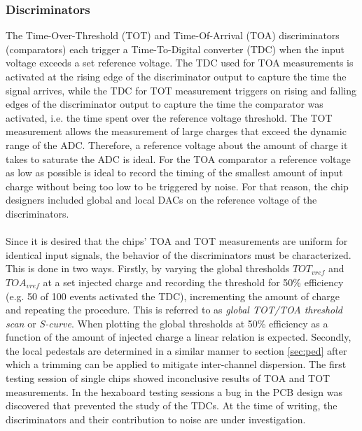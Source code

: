 \documentclass[../../main.tex]{subfiles}
\begin{document}
\subsubsection{Discriminators}
The Time-Over-Threshold (TOT) and Time-Of-Arrival (TOA) discriminators (comparators) each trigger a Time-To-Digital converter (TDC) when the input voltage exceeds a set reference voltage. The TDC used for TOA measurements is activated at the rising edge of the discriminator output to capture the time the signal arrives, while the TDC for TOT measurement triggers on rising and falling edges of the discriminator output to capture the time the comparator was activated, i.e. the time spent over the reference voltage threshold. The TOT measurement allows the measurement of large charges that exceed the dynamic range of the ADC. Therefore, a reference voltage about the amount of charge it takes to saturate the ADC is ideal. For the TOA comparator a reference voltage as low as possible is ideal to record the timing of the smallest amount of input charge without being too low to be triggered by noise. For that reason, the chip designers included global and local DACs on the reference voltage of the discriminators.\\
\\
Since it is desired that the chips' TOA and TOT measurements are uniform for identical input signals, the behavior of the discriminators must be characterized. This is done in two ways. Firstly, by varying the global thresholds $TOT_{vref}$ and $TOA_{vref}$ at a set injected charge and recording the threshold for 50\% efficiency (e.g. 50 of 100 events activated the TDC), incrementing the amount of charge and repeating the procedure. This is referred to as \textit{global TOT/TOA threshold scan} or \textit{S-curve}. When plotting the global thresholds at 50\% efficiency as a function of the amount of injected charge a linear relation is expected. Secondly, the local pedestals are determined in a similar manner to section \ref{sec:ped} after which a trimming can be applied to mitigate inter-channel dispersion. The first testing session of single chips showed inconclusive results of TOA and TOT measurements. In the hexaboard testing sessions a bug in the PCB design was discovered that prevented the study of the TDCs. At the time of writing, the discriminators and their contribution to noise are under investigation.
\end{document}
